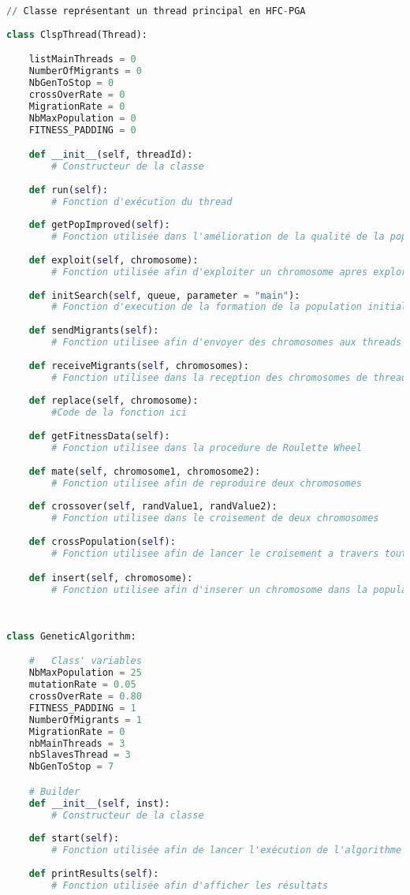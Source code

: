     \begin{lstlisting}[language=python]
    // Classe représentant un thread principal en HFC-PGA
    
class ClspThread(Thread):

	listMainThreads = 0
	NumberOfMigrants = 0
	NbGenToStop = 0
	crossOverRate = 0
	MigrationRate = 0
	NbMaxPopulation = 0
	FITNESS_PADDING = 0

	def __init__(self, threadId):
		# Constructeur de la classe	
	
	def run(self):
		# Fonction d'exécution du thread	
	
	def getPopImproved(self):
		# Fonction utilisée dans l'amélioration de la qualité de la population initiale	
	
	def exploit(self, chromosome):
		# Fonction utilisée afin d'exploiter un chromosome apres exploration 
		
	def initSearch(self, queue, parameter = "main"):
		# Fonction d'execution de la formation de la population initiale	
	
	def sendMigrants(self):
		# Fonction utilisee afin d'envoyer des chromosomes aux threads voisins	
	
	def receiveMigrants(self, chromosomes):
		# Fonction utilisee dans la reception des chromosomes de threads voisins	
	
	def replace(self, chromosome):
		#Code de la fonction ici	
	
	def getFitnessData(self):
		# Fonction utilisee dans la procedure de Roulette Wheel	
	
	def mate(self, chromosome1, chromosome2):
		# Fonction utilisee afin de reproduire deux chromosomes	
	
	def crossover(self, randValue1, randValue2):
		# Fonction utilisee dans le croisement de deux chromosomes
	
	def crossPopulation(self):
		# Fonction utilisee afin de lancer le croisement a travers toute la population	

	def insert(self, chromosome):
		# Fonction utilisee afin d'inserer un chromosome dans la population initiale	
		
		
    \end{lstlisting}
    
    \begin{lstlisting}[language=python]
class GeneticAlgorithm:

	#	Class' variables
	NbMaxPopulation = 25
	mutationRate = 0.05
	crossOverRate = 0.80
	FITNESS_PADDING = 1
	NumberOfMigrants = 1
	MigrationRate = 0 
	nbMainThreads = 3
	nbSlavesThread = 3
	NbGenToStop = 7

	# Builder
	def __init__(self, inst):
		# Constructeur de la classe
	
	def start(self):
		# Fonction utilisée afin de lancer l'exécution de l'algorithme génétique
	
	def printResults(self):
		# Fonction utilisée afin d'afficher les résultats
		
    \end{lstlisting}
	

